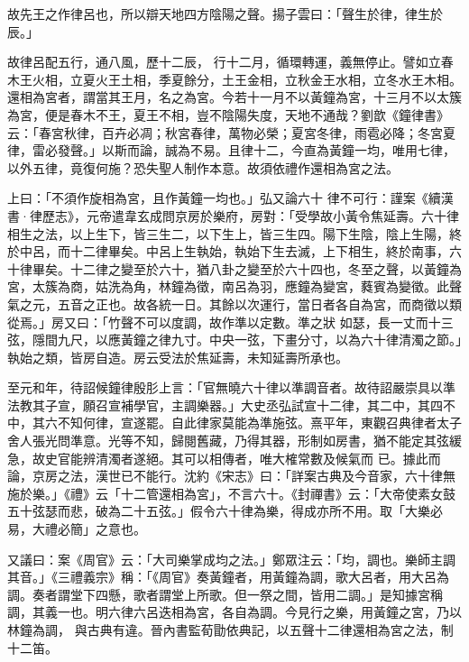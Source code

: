 \begin{pinyinscope}
 故先王之作律呂也，所以辯天地四方陰陽之聲。揚子雲曰：「聲生於律，律生於辰。」



 故律呂配五行，通八風，歷十二辰，
 行十二月，循環轉運，義無停止。譬如立春木王火相，立夏火王土相，季夏餘分，土王金相，立秋金王水相，立冬水王木相。還相為宮者，謂當其王月，名之為宮。今若十一月不以黃鐘為宮，十三月不以太簇為宮，便是春木不王，夏王不相，豈不陰陽失度，天地不通哉？劉歆《鐘律書》云：「春宮秋律，百卉必凋；秋宮春律，萬物必榮；夏宮冬律，雨雹必降；冬宮夏律，雷必發聲。」以斯而論，誠為不易。且律十二，今直為黃鐘一均，唯用七律，以外五律，竟復何施？恐失聖人制作本意。故須依禮作還相為宮之法。



 上曰：「不須作旋相為宮，且作黃鐘一均也。」弘又論六十
 律不可行：謹案《續漢書·律歷志》，元帝遣韋玄成問京房於樂府，房對：「受學故小黃令焦延壽。六十律相生之法，以上生下，皆三生二，以下生上，皆三生四。陽下生陰，陰上生陽，終於中呂，而十二律畢矣。中呂上生執始，執始下生去滅，上下相生，終於南事，六十律畢矣。十二律之變至於六十，猶八卦之變至於六十四也，冬至之聲，以黃鐘為宮，太簇為商，姑洗為角，林鐘為徵，南呂為羽，應鐘為變宮，蕤賓為變徵。此聲氣之元，五音之正也。故各統一日。其餘以次運行，當日者各自為宮，而商徵以類從焉。」房又曰：「竹聲不可以度調，故作準以定數。準之狀
 如瑟，長一丈而十三弦，隱間九尺，以應黃鐘之律九寸。中央一弦，下畫分寸，以為六十律清濁之節。」執始之類，皆房自造。房云受法於焦延壽，未知延壽所承也。



 至元和年，待詔候鐘律殷肜上言：「官無曉六十律以準調音者。故待詔嚴崇具以準法教其子宣，願召宣補學官，主調樂器。」大史丞弘試宣十二律，其二中，其四不中，其六不知何律，宣遂罷。自此律家莫能為準施弦。熹平年，東觀召典律者太子舍人張光問準意。光等不知，歸閱舊藏，乃得其器，形制如房書，猶不能定其弦緩急，故史官能辨清濁者遂絕。其可以相傳者，唯大榷常數及候氣而
 已。據此而論，京房之法，漢世已不能行。沈約《宋志》曰：「詳案古典及今音家，六十律無施於樂。」《禮》云「十二管還相為宮」，不言六十。《封禪書》云：「大帝使素女鼓五十弦瑟而悲，破為二十五弦。」假令六十律為樂，得成亦所不用。取「大樂必易，大禮必簡」之意也。



 又議曰：案《周官》云：「大司樂掌成均之法。」鄭眾注云：「均，調也。樂師主調其音。」《三禮義宗》稱：「《周官》奏黃鐘者，用黃鐘為調，歌大呂者，用大呂為調。奏者謂堂下四懸，歌者謂堂上所歌。但一祭之間，皆用二調。」是知據宮稱調，其義一也。明六律六呂迭相為宮，各自為調。今見行之樂，用黃鐘之宮，乃以林鐘為調，
 與古典有違。晉內書監荀勖依典記，以五聲十二律還相為宮之法，制十二笛。




\end{pinyinscope}
